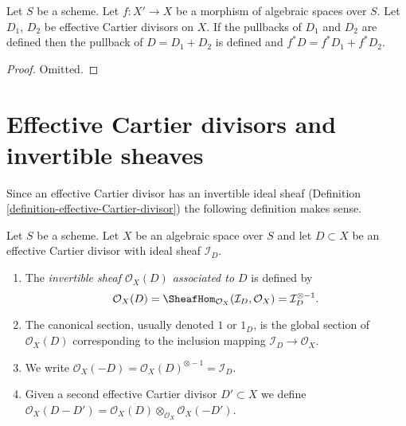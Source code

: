 \begin{lemma}
\label{lemma-pullback-effective-Cartier-divisors-additive}
Let $S$ be a scheme.
Let $f : X' \to X$ be a morphism of algebraic spaces over $S$.
Let $D_1$, $D_2$ be effective Cartier divisors on $X$.
If the pullbacks of $D_1$ and $D_2$ are defined then the
pullback of $D = D_1 + D_2$ is defined and
$f^*D = f^*D_1 + f^*D_2$.
\end{lemma}

\begin{proof}
Omitted.
\end{proof}




\section{Effective Cartier divisors and invertible sheaves}
\label{section-effective-Cartier-invertible}

\noindent
Since an effective Cartier divisor has an invertible ideal sheaf
(Definition \ref{definition-effective-Cartier-divisor}) the
following definition makes sense.

\begin{definition}
\label{definition-invertible-sheaf-effective-Cartier-divisor}
Let $S$ be a scheme. Let $X$ be an algebraic space over $S$
and let $D \subset X$ be an effective Cartier divisor with ideal
sheaf $\mathcal{I}_D$.
\begin{enumerate}
\item The {\it invertible sheaf $\mathcal{O}_X(D)$ associated to $D$}
is defined by
$$
\mathcal{O}_X(D) =
\SheafHom_{\mathcal{O}_X}(\mathcal{I}_D, \mathcal{O}_X) =
\mathcal{I}_D^{\otimes -1}.
$$
\item The canonical section, usually denoted $1$ or $1_D$, is the
global section of $\mathcal{O}_X(D)$ corresponding to
the inclusion mapping $\mathcal{I}_D \to \mathcal{O}_X$.
\item We write
$\mathcal{O}_X(-D) = \mathcal{O}_X(D)^{\otimes -1} = \mathcal{I}_D$.
\item Given a second effective Cartier divisor $D' \subset X$ we define
$\mathcal{O}_X(D - D') =
\mathcal{O}_X(D) \otimes_{\mathcal{O}_X} \mathcal{O}_X(-D')$.
\end{enumerate}
\end{definition}

